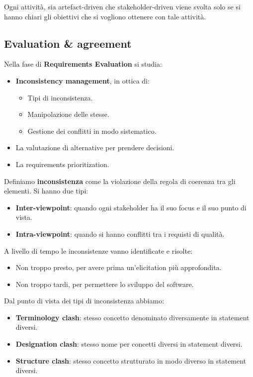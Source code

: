 Ogni attività, sia artefact-driven che stakeholder-driven viene svolta solo se
si hanno chiari gli obiettivi che si vogliono ottenere con tale attività.
\subsection{Evaluation \& agreement}
Nella fase di \textbf{Requirements Evaluation} si studia:
\begin{itemize}
      \item \textbf{Inconsistency management}, in ottica di:
            \begin{itemize}
                  \item Tipi di inconsistenza.
                  \item Manipolazione delle stesse.
                  \item Gestione dei conflitti in modo sistematico.
            \end{itemize}
      \item La valutazione di alternative per prendere decisioni.
      \item La requirements prioritization.
\end{itemize}
\begin{definizione}
      Definiamo \textbf{inconsistenza} come la violazione della regola di coerenza
      tra gli elementi. Si hanno due tipi:
      \begin{itemize}
            \item \textbf{Inter-viewpoint}: quando ogni stakeholder ha il suo
                  focus e il suo punto di vista.
            \item \textbf{Intra-viewpoint}: quando si hanno conflitti tra i
                  requisti di qualità.
      \end{itemize}
\end{definizione}
A livello di tempo le inconsistenze vanno identificate e risolte:
\begin{itemize}
      \item Non troppo presto, per avere prima un'elicitation più approfondita.
      \item Non troppo tardi, per permettere lo sviluppo del software.
\end{itemize}
Dal punto di vista dei tipi di inconsistenza abbiamo:
\begin{itemize}
      \item \textbf{Terminology clash}: stesso concetto denominato diversamente
            in statement diversi.
      \item \textbf{Designation clash}: stesso nome per concetti diversi in
            statement diversi.
      \item \textbf{Structure clash}: stesso concetto strutturato in modo diverso
            in statement diversi.
\end{itemize}
